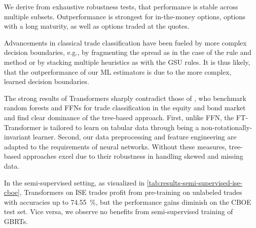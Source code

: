 \documentclass[oneside,a4paper,10pt]{article} %
\begin{document}
We derive from exhaustive robustness tests, that performance is stable across multiple subsets. Outperformance is strongest for in-the-money options, options with a long maturity, as well as options traded at the quotes.

Advancements in classical trade classification have been fueled by more complex decision boundaries, e.g., by fragmenting the spread as in the case of the  rule and  method or by stacking multiple heuristics as with the \gls{GSU} rules. It is thus likely, that the outperformance of our \gls{ML} estimators is due to the more complex, learned decision boundaries.

The strong results of Transformers sharply contradict those of \textcite[][]{ronenMachineLearningTrade2022}, who benchmark random forests and \glspl{FFN} for trade classification in the equity and bond market and find clear dominance of the tree-based approach. First, unlike \gls{FFN}, the FT-Transformer is tailored to learn on tabular data through being a non-rotationally-invariant learner. Second, our data preprocessing and feature engineering are adapted to the requirements of neural networks. Without these measures, tree-based approaches excel due to their robustness in handling skewed and missing data.

In the semi-supervised setting, as visualized in \cref{tab:results-semi-supervised-ise-cboe}, Transformers on \gls{ISE} trades profit from pre-training on unlabeled trades with accuracies up to \SI{74.55}{\percent}, but the performance gains diminish on the \gls{CBOE} test set. Vice versa, we observe no benefits from semi-supervised training of \glspl{GBRT}.
\end{document}
